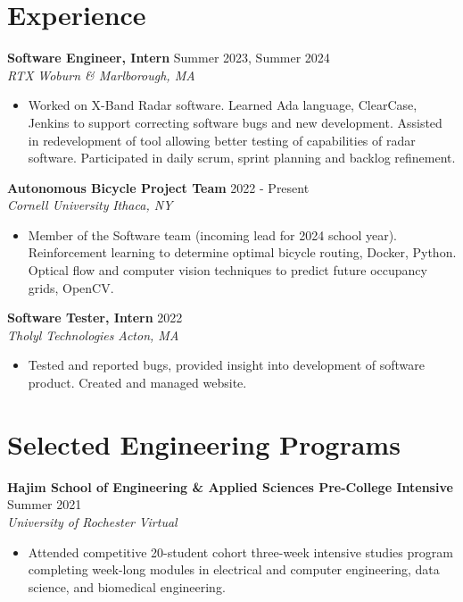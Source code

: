 \documentclass[letterpaper,8pt]{article}
\newcommand{\resumeEntry}[4]{
    \vspace{4pt}
    \large \textbf{#1}
    \normalsize \hfill #2
    \\
    \textit{#3} \hfill \textit{#4}
    \vspace{1pt}
}
\newcommand{\itemsBegin}{
    \begin{itemize}[leftmargin=0.2in, labelsep=0.05in, itemsep=0pt, parsep=1pt, topsep=0pt, partopsep=0pt]
}
\newcommand{\itemsEnd}{\end{itemize}}
\begin{document}
\section{Experience}

    \resumeEntry
        {Software Engineer, Intern}
        {Summer 2023, Summer 2024}
        {RTX}
        {Woburn \& Marlborough, MA}

    \itemsBegin
        \item Worked on X-Band Radar software. Learned Ada language, ClearCase, Jenkins to support correcting software bugs and new development. Assisted in redevelopment of tool allowing better testing of capabilities of radar software. Participated in daily scrum, sprint planning and backlog refinement.
    \itemsEnd

    \resumeEntry
        {Autonomous Bicycle Project Team}
        {2022 - Present}
        {Cornell University}
        {Ithaca, NY}

    \itemsBegin
        \item Member of the Software team (incoming lead for 2024 school year). Reinforcement learning to determine optimal bicycle routing, Docker, Python. Optical flow and computer vision techniques to predict future occupancy grids, OpenCV.
    \itemsEnd

    \resumeEntry
        {Software Tester, Intern}
        {2022}
        {Tholyl Technologies}
        {Acton, MA}

    \itemsBegin
        \item Tested and reported bugs, provided insight into development of software product. Created and managed website.
    \itemsEnd

\section{Selected Engineering Programs}


    \resumeEntry
        {Hajim School of Engineering \& Applied Sciences Pre-College Intensive}
        {Summer 2021}
        {University of Rochester}
        {Virtual}

    \itemsBegin
        \item Attended competitive 20-student cohort three-week intensive studies program completing week-long modules in electrical and computer engineering, data science, and biomedical engineering.
    \itemsEnd
\end{document}
